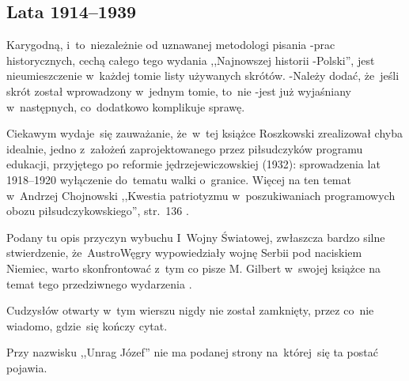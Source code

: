 \documentclass[a4paper,11pt]{article}
\begin{document}
\subsection{Lata 1914--1939}

\vspace{\spaceThree}






\start Karygodną, i~to~niezależnie od uznawanej metodologi pisania
-prac historycznych, cechą całego tego wydania ,,Najnowszej historii
-Polski'', jest nieumieszczenie w~każdej tomie listy używanych
skrótów. -Należy dodać, że~jeśli skrót został wprowadzony w~jednym
tomie, to~nie -jest już wyjaśniany w~następnych, co~dodatkowo
komplikuje sprawę.

\vspace{\spaceFour}


\start Ciekawym wydaje~się zauważanie, że~w~tej książce Roszkowski
zrealizował chyba idealnie, jedno z~założeń zaprojektowanego przez
piłsudczyków programu edukacji, przyjętego po reformie
jędrzejewiczowskiej (1932): sprowadzenia lat 1918--1920 wyłączenie
do~tematu walki o~granice. Więcej na ten temat \\
w~Andrzej Chojnowski ,,Kwestia patriotyzmu w~poszukiwaniach
programowych obozu piłsudczykowskiego'', str.~136
\cite{PatriotyzmPolakow2006}.

\vspace{\spaceFour}


\start {} Podany tu opis przyczyn wybuchu I~Wojny Światowej,
zwłaszcza bardzo silne stwierdzenie, że~Austro\dywiz Węgry
wypowiedziały wojnę Serbii pod naciskiem Niemiec, warto skonfrontować
z~tym co pisze M. Gilbert w~swojej książce na temat tego przedziwnego
wydarzenia \cite{GilbertPierwszaWojnaSwiatowa2003}.

\vspace{\spaceFour}


\start {} Cudzysłów otwarty w~tym wierszu nigdy nie został
zamknięty, przez co~nie wiadomo, gdzie~się kończy cytat.

\start {} Przy nazwisku ,,Unrag Józef'' nie ma podanej
strony na~której~się ta postać pojawia.
\end{document}
